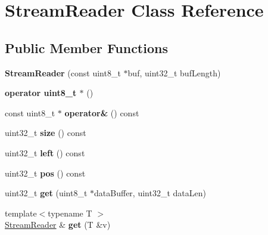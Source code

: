 \hypertarget{classStreamReader}{\section{Stream\-Reader Class Reference}
\label{classStreamReader}
}
\subsection*{Public Member Functions}
\begin{DoxyCompactItemize}
\item 
\hypertarget{classStreamReader_adb359a787c4775852ef2783c34d09577}{{\bfseries Stream\-Reader} (const uint8\-\_\-t $\ast$buf, uint32\-\_\-t buf\-Length)}\label{classStreamReader_adb359a787c4775852ef2783c34d09577}

\item 
\hypertarget{classStreamReader_aab323115d230999a931032e352a753f7}{{\bfseries operator uint8\-\_\-t $\ast$} ()}\label{classStreamReader_aab323115d230999a931032e352a753f7}

\item 
\hypertarget{classStreamReader_a7ef0a3a351a4072eb049a0f0debd920c}{const uint8\-\_\-t $\ast$ {\bfseries operator\&} () const }\label{classStreamReader_a7ef0a3a351a4072eb049a0f0debd920c}

\item 
\hypertarget{classStreamReader_a0f0d6d6eec18b7699a1806427978559d}{uint32\-\_\-t {\bfseries size} () const }\label{classStreamReader_a0f0d6d6eec18b7699a1806427978559d}

\item 
\hypertarget{classStreamReader_afe0fc34cc75e35951c1f06454a2d0eff}{uint32\-\_\-t {\bfseries left} () const }\label{classStreamReader_afe0fc34cc75e35951c1f06454a2d0eff}

\item 
\hypertarget{classStreamReader_a8a6fff4125562c6d41e5ebc930a8bcfc}{uint32\-\_\-t {\bfseries pos} () const }\label{classStreamReader_a8a6fff4125562c6d41e5ebc930a8bcfc}

\item 
\hypertarget{classStreamReader_a565741b378451f29e8a43057dcd34561}{uint32\-\_\-t {\bfseries get} (uint8\-\_\-t $\ast$data\-Buffer, uint32\-\_\-t data\-Len)}\label{classStreamReader_a565741b378451f29e8a43057dcd34561}

\item 
\hypertarget{classStreamReader_ae6750c5d809e1933bfe36e2aa01fb354}{{\footnotesize template$<$typename T $>$ }\\\hyperlink{classStreamReader}{Stream\-Reader} \& {\bfseries get} (T \&v)}\label{classStreamReader_ae6750c5d809e1933bfe36e2aa01fb354}


\end{DoxyCompactItemize}

